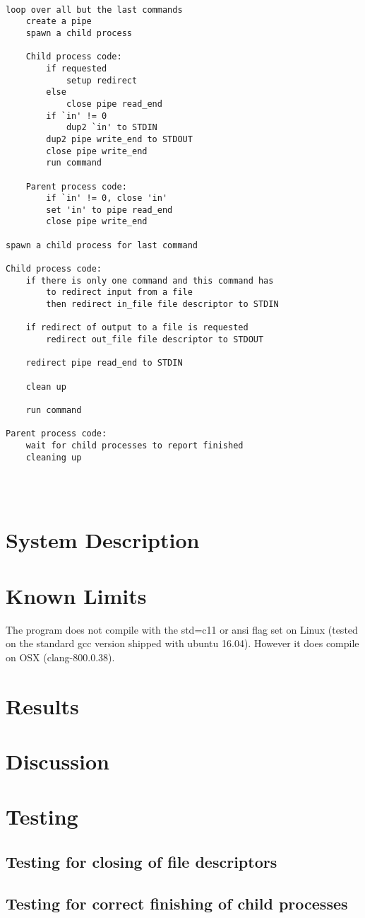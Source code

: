 \documentclass[a4paper,11pt,twoside]{article}
\begin{document}
\begin{verbatim}

loop over all but the last commands 
    create a pipe
    spawn a child process

    Child process code:
        if requested 
            setup redirect
        else
            close pipe read_end
        if `in' != 0
            dup2 `in' to STDIN
        dup2 pipe write_end to STDOUT
        close pipe write_end
        run command

    Parent process code:
        if `in' != 0, close 'in'
        set 'in' to pipe read_end 
        close pipe write_end

spawn a child process for last command

Child process code:
    if there is only one command and this command has 
        to redirect input from a file
        then redirect in_file file descriptor to STDIN

    if redirect of output to a file is requested
        redirect out_file file descriptor to STDOUT

    redirect pipe read_end to STDIN

    clean up

    run command

Parent process code:
    wait for child processes to report finished
    cleaning up

 


\end{verbatim}


\section{System Description}



\section{Known Limits}
The program does not compile with the std=c11 or ansi flag set on Linux (tested on the standard gcc version shipped with ubuntu 16.04). However it does compile on OSX (clang-800.0.38).  

\section{Results}

\section{Discussion}

\section{Testing}

\subsection{Testing for closing of file descriptors}

\subsection{Testing for correct finishing of child processes}



\end{document}
